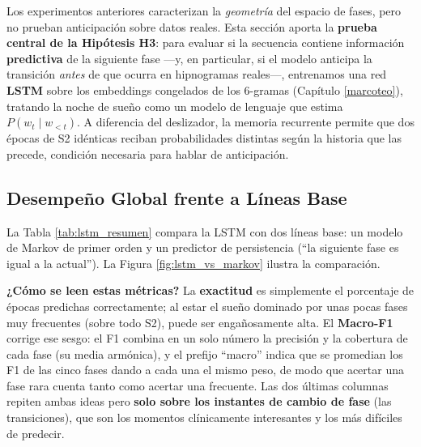Los experimentos anteriores caracterizan la \textit{geometría} del espacio de fases, pero no prueban anticipación sobre datos reales. Esta sección aporta la \textbf{prueba central de la Hipótesis H3}: para evaluar si la secuencia contiene información \textbf{predictiva} de la siguiente fase ---y, en particular, si el modelo anticipa la transición \textit{antes} de que ocurra en hipnogramas reales---, entrenamos una red \textbf{LSTM} sobre los embeddings congelados de los 6-gramas (Capítulo \ref{marcoteo}), tratando la noche de sueño como un modelo de lenguaje que estima $P(w_t \mid w_{<t})$. A diferencia del deslizador, la memoria recurrente permite que dos épocas de S2 idénticas reciban probabilidades distintas según la historia que las precede, condición necesaria para hablar de anticipación.

\subsection{Desempeño Global frente a Líneas Base}

La Tabla \ref{tab:lstm_resumen} compara la LSTM con dos líneas base: un modelo de Markov de primer orden y un predictor de persistencia (``la siguiente fase es igual a la actual''). La Figura \ref{fig:lstm_vs_markov} ilustra la comparación.

\textbf{¿Cómo se leen estas métricas?} La \textbf{exactitud} es simplemente el porcentaje de épocas predichas correctamente; al estar el sueño dominado por unas pocas fases muy frecuentes (sobre todo S2), puede ser engañosamente alta. El \textbf{Macro-F1} corrige ese sesgo: el F1 combina en un solo número la precisión y la cobertura de cada fase (su media armónica), y el prefijo ``macro'' indica que se promedian los F1 de las cinco fases dando a cada una el mismo peso, de modo que acertar una fase rara cuenta tanto como acertar una frecuente. Las dos últimas columnas repiten ambas ideas pero \textbf{solo sobre los instantes de cambio de fase} (las transiciones), que son los momentos clínicamente interesantes y los más difíciles de predecir.

\begin{table}[htbp]
\centering
\caption{Desempeño de la LSTM frente a líneas base. La columna ``transición'' mide la exactitud restringida a los instantes en que la fase realmente cambia.}
\label{tab:lstm_resumen}
\noindent{}
\end{table}


